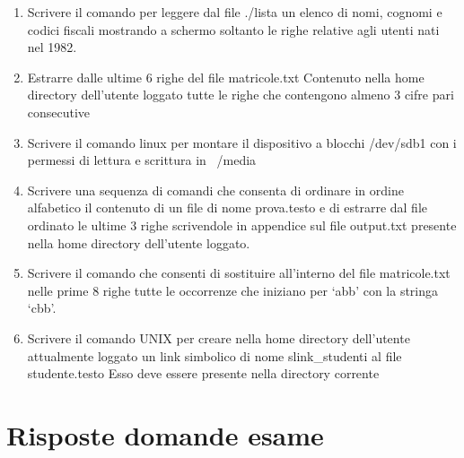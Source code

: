 \documentclass{report}
\begin{document}
\begin{enumerate}
    \item Scrivere il comando per leggere dal file ./lista un elenco di nomi, cognomi e codici fiscali mostrando a schermo soltanto le righe relative agli utenti nati nel 1982.

    \item Estrarre dalle ultime 6 righe del file matricole.txt Contenuto nella home directory dell’utente loggato tutte le righe che contengono almeno 3 cifre pari consecutive

    \item Scrivere il comando linux per montare il dispositivo a blocchi /dev/sdb1 con i permessi di lettura e scrittura in ~/media

    \item Scrivere una sequenza di comandi che consenta di ordinare in ordine alfabetico il contenuto di un
file di nome prova.testo e di estrarre dal file ordinato le ultime 3 righe scrivendole in appendice sul file output.txt presente nella home directory dell’utente loggato.


    \item Scrivere il comando che consenti di sostituire all'interno del file matricole.txt nelle prime 8 righe
tutte le occorrenze che iniziano per ‘abb’ con la stringa ‘cbb’.

\item Scrivere il comando UNIX per creare nella home directory dell’utente attualmente loggato un link simbolico di nome slink\_studenti al file studente.testo  Esso deve essere presente nella directory corrente
\end{enumerate}
\newpage
\section{Risposte domande esame}
\end{document}
